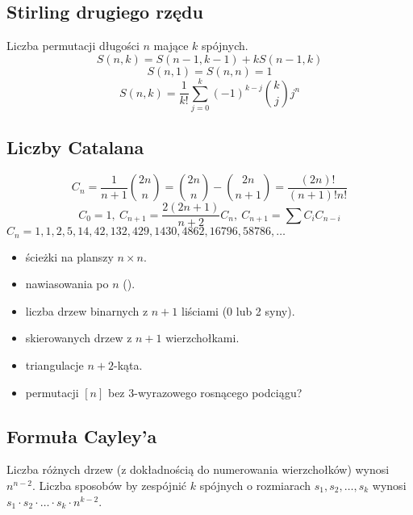 	\subsection{Stirling drugiego rzędu}
		Liczba permutacji długości $n$ mające $k$ spójnych.
		$$S(n,k) = S(n-1,k-1) + k S(n-1,k)$$
		$$S(n,1) = S(n,n) = 1$$
		$$S(n,k) = \frac{1}{k!}\sum_{j=0}^k (-1)^{k-j}\binom{k}{j}j^n$$

	\subsection{Liczby Catalana}
		\[ C_n=\frac{1}{n+1}\binom{2n}{n}= \binom{2n}{n}-\binom{2n}{n+1} = \frac{(2n)!}{(n+1)!n!} \]
		\[ C_0=1,\ C_{n+1} = \frac{2(2n+1)}{n+2}C_n,\ C_{n+1}=\sum C_iC_{n-i} \]
		${C_n = 1, 1, 2, 5, 14, 42, 132, 429, 1430, 4862, 16796, 58786, \dots}$

		\begin{itemize}[noitemsep]
			\item ścieżki na planszy $n\times n$.
			\item nawiasowania po $n$ ().
			\item liczba drzew binarnych z $n+1$ liściami (0 lub 2 syny).
			\item skierowanych drzew z $n+1$ wierzchołkami.
			\item triangulacje $n+2$-kąta.
			\item permutacji $[n]$ bez 3-wyrazowego rosnącego podciągu?
		\end{itemize}

		\hfil
	
	\subsection{Formuła Cayley'a}
		Liczba różnych drzew (z dokładnością do numerowania wierzchołków) wynosi $n^{n-2}$.
		Liczba sposobów by zespójnić $k$ spójnych o rozmiarach $s_1, s_2, \dots, s_k$ wynosi $s_1 \cdot s_2 \cdot \dots \cdot s_k \cdot n^{k-2}$.

